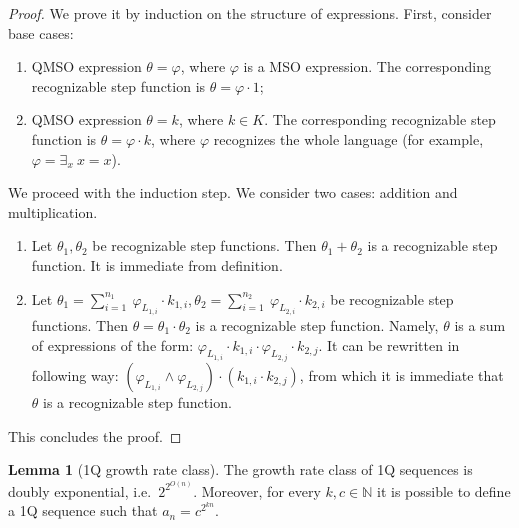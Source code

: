 \documentclass[en]{pracamgr}
\theoremstyle{definition}
\newtheorem{lemma}[theorem]{Lemma}
\begin{document}
\begin{proof}
    We prove it by induction on the structure of expressions.
    First, consider base cases:
    \begin{enumerate}
        \item QMSO expression $\theta = \varphi$, where $\varphi$ is a MSO expression. The corresponding recognizable step function is $\theta = \varphi \cdot 1$;
        \item QMSO expression $\theta = k$, where $k \in K$. The corresponding recognizable step function is $\theta = \varphi \cdot k$, where $\varphi$ recognizes the whole language (for example, $\varphi = \exists_x \ x = x$).
    \end{enumerate}

    We proceed with the induction step. We consider two cases: addition and multiplication.
    \begin{enumerate}
        \item Let $\theta_1, \theta_2$ be recognizable step functions. Then $\theta_1 + \theta_2$ is a recognizable step function. It is immediate from definition.
        \item Let $\theta_1 = \sum_{i = 1}^{n_1} \ \varphi_{L_{1,i}} \cdot k_{1,i}, \theta_2 = \sum_{i = 1}^{n_2} \ \varphi_{L_{2,i}} \cdot k_{2,i}$ be recognizable step functions. Then $\theta = \theta_1 \cdot \theta_2$ is a recognizable step function. Namely, $\theta$ is a sum of expressions of the form: $\varphi_{L_{1,i}} \cdot k_{1, i} \cdot \varphi_{L_{2,j}} \cdot k_{2,j}$. It can be rewritten in following way: $(\varphi_{L_{1,i}} \land \varphi_{L_{2,j}}) \cdot (k_{1,i} \cdot k_{2,j})$, from which it is immediate that $\theta$ is a recognizable step function.
    \end{enumerate}
This concludes the proof.
\end{proof}

\begin{lemma}[1Q growth rate class]
    The growth rate class of 1Q sequences is doubly exponential, i.e.\ $2^{2^{O(n)}}$. Moreover, for every $k, c \in \mathbb{N}$ it is possible to define a 1Q sequence such that $a_n = c^{2^{kn}}$.
\end{lemma}
\end{document}
